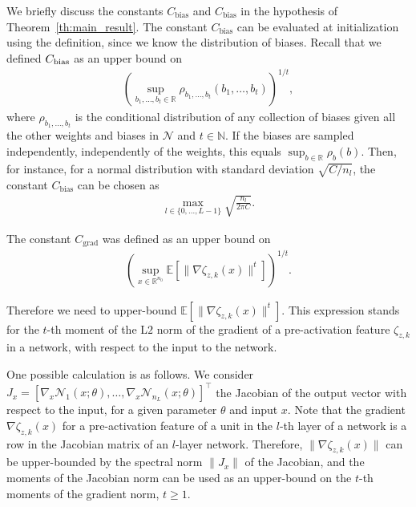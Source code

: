 \documentclass{article}
\theoremstyle{definition}
\newcommand{\net}{\mathcal{N}}
\newcommand{\nin}{n_0}
\begin{document}
We briefly discuss the constants $C_{\text{bias}}$ and $C_{\text{bias}}$ in the hypothesis of Theorem~\ref{th:main_result}. 
The constant $C_{\text{bias}}$ can be evaluated at initialization using the definition, since we know the distribution of biases. Recall that we defined $C_{\text{\normalfont bias}}$ as an upper bound on
\begin{align*}
    \left( \sup \limits_{b_{1}, \dots, b_{t}\in \mathbb{R}} \rho_{b_{1}, \dots, b_{t}} (b_{1}, \dots, b_{t}) \right)^{1/t},
\end{align*}
where $\rho_{b_{1}, \dots, b_{t}}$ is the conditional distribution of any collection of biases given all the other weights and biases in $\net$ and $t \in \mathbb{N}$.
If the biases are sampled independently, independently of the weights, this equals $\sup_{b \in \mathbb{R}} \rho_{b} (b)$. 
Then, for instance, 
for a normal distribution with standard deviation $\sqrt{C/n_l}$, the constant $C_{\text{bias}}$ can be chosen as 
\begin{align*}
    \max_{l \in \{0, \dots, L - 1\}} \sqrt{\frac{n_l}{2 \pi C}}. 
\end{align*}

The constant $C_{\text{grad}}$ was defined as an upper bound on
\begin{align*}
    \left(\sup\limits_{x \in \mathbb{R}^{\nin}} \mathbb{E}[\| \nabla \zeta_{z, k}(x) \|^t]\right)^{1/t}.
\end{align*}

Therefore we need to upper-bound $\mathbb{E} \left[ \| \nabla \zeta_{z, k}(x) \|^{t} \right]$.
This expression stands for the $t$-th moment of the L$2$ norm of the gradient of a pre-activation feature $\zeta_{z,k}$ in a network, with respect to the input to the network. 

One possible calculation is as follows. We consider $J_x = [\nabla_x \mathcal{N}_1(x;\theta),\ldots, \nabla_x \mathcal{N}_{n_L}(x;\theta)]^\top$ the Jacobian of the output vector  with respect to the input, for a given parameter $\theta$ and input $x$. 
%
Note that the gradient $\nabla \zeta_{z, k}(x)$ for a pre-activation feature of a unit in the $l$-th layer of a network is a row in the Jacobian matrix of an $l$-layer network. 
Therefore, $ \| \nabla \zeta_{z, k}(x) \|$ can be upper-bounded by the spectral norm $\|J_x\|$ of the Jacobian, and the moments of the Jacobian norm can be used as an upper-bound on the $t$-th moments of the gradient norm, $t \geq 1$. 
%
\end{document}
